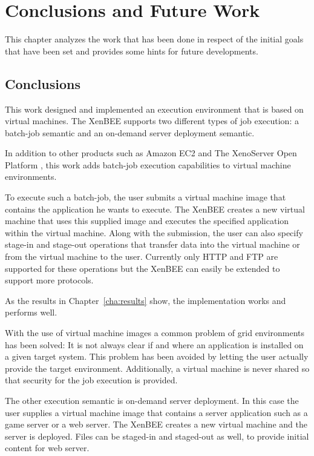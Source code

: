 
\chapter{Conclusions and Future Work}
\label{cha:conclusions}

This  chapter analyzes  the work  that  has been  done in  respect of  the
initial  goals that  have  been set  and  provides some  hints for  future
developments.

\section*{Conclusions}

This work designed and implemented  an execution environment that is based
on  virtual machines.  The  XenBEE  supports two  different  types of  job
execution:  a  batch-job  semantic  and  an  on-demand  server  deployment
semantic.

In addition to other products such as Amazon EC2 \cite{amazon-ec2} and The
XenoServer  Open Platform  \cite{kotsovinos05}, this  work  adds batch-job
execution capabilities to virtual machine environments.

To execute such a batch-job, the user submits a virtual machine image that
contains the  application he wants to  execute.  The XenBEE  creates a new
virtual machine that  uses this supplied image and  executes the specified
application  within the virtual  machine. Along  with the  submission, the
user can also specify stage-in and stage-out operations that transfer data
into   the  virtual   machine  or   from  the   virtual  machine   to  the
user. Currently only  HTTP and FTP are supported  for these operations but
the XenBEE can easily be extended to support more protocols.

As the results in Chapter~\ref{cha:results} show, the implementation works
and performs well.

With  the  use  of  virtual  machine  images  a  common  problem  of  grid
environments  has been  solved: It  is not  always clear  if and  where an
application is installed on a  given target system.  This problem has been
avoided   by    letting   the    user   actually   provide    the   target
environment.  Additionally, a  virtual  machine is  never  shared so  that
security for the job execution is provided.

\medskip

The other execution semantic is  on-demand server deployment. In this case
the  user  supplies  a  virtual  machine  image  that  contains  a  server
application such  as a game server or  a web server. The  XenBEE creates a
new virtual machine and the server is deployed. Files can be staged-in and
staged-out as well, \eg to provide initial content for web server.

